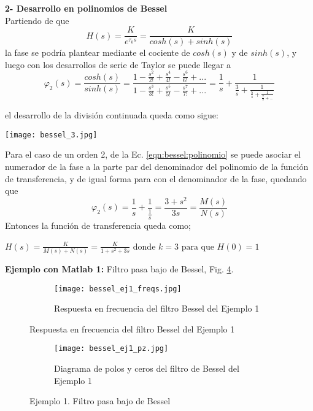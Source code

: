 \documentclass[informe.tex]{subfiles}
\begin{document}
\textbf{2- Desarrollo en polinomios de Bessel}\\	

Partiendo de que $$ H(s)= \frac{K}{ e^{\tau_0 s}} = \frac{K}{ cosh(s)+sinh(s)}$$  la fase se podría plantear mediante el cociente de $cosh(s)$ y de $sinh(s)$, y luego con los desarrollos de serie de Taylor se puede llegar a 
	\begin{equation}
		\label{eqn:bessel:polinomio} 
\varphi_2(s) =\frac{cosh(s)}{sinh(s)}
		            =\frac{1 - \frac{s^2}{2!} +  \frac{s^4}{4!} -  \frac{s^6}{6!}+ ...}
		                  {1 - \frac{s^3}{3!} +  \frac{s^5}{5!} -  \frac{s^7}{7!}+ ...}
		            =\frac{1}{s} + \frac{1}{\frac{3}{s} + \frac{1}{\frac{5}{s}+ \frac{1}{\frac{7}{s} + ...}}}				                  
	\end{equation}

el desarrollo de la división continuada queda como sigue:
	\begin{center}
		\texttt{[image: bessel\_3.jpg]}
	\end{center}		
	
Para el caso de un orden 2, de la Ec. \ref{eqn:bessel:polinomio} se puede asociar el numerador de la fase a la parte par del denominador del polinomio de la función de transferencia, y de igual forma para con el denominador de la fase, quedando que 
	$$
		\varphi_2(s) = \frac{1}{s} + \frac{1}{\frac{1}{s}} = \frac{3+s^2}{3s} = \frac{M(s)}{N(s)}
	$$
Entonces la función de transferencia queda como;
	\begin{center}
		$H(s)=\frac{K}{M(s)+N(s)}=\frac{K}{1+s^2+3s}$ donde $k=3 \mbox{ para que } H(0)=1$ 	
	\end{center}

\textbf{\newpage Ejemplo con Matlab 1:} Filtro pasa bajo de Bessel, Fig. \ref{fig:func:bessel:ej1}. \newline 
  
     
    	
\begin{figure}[h]
     \centering
     \begin{subfigure}[b]{1\textwidth}
         \centering
         \texttt{[image: bessel\_ej1\_freqs.jpg]}
         \caption{Respuesta en frecuencia del filtro Bessel del Ejemplo 1}
         \label{fig:func:bessel:ej1:freqs_bp}
     \end{subfigure}
\end{figure}     

\begin{figure}[h]
	\ContinuedFloat
     \begin{subfigure}[b]{1\textwidth}
         \centering
         \texttt{[image: bessel\_ej1\_pz.jpg]}
         \caption{Diagrama de polos y ceros del filtro de Bessel del Ejemplo 1}
         \label{fig:func:bessel:ej1:pz}
     \end{subfigure}
     \caption{Ejemplo 1. Filtro pasa bajo de Bessel}
     \label{fig:func:bessel:ej1}
\end{figure}
 
\end{document}
